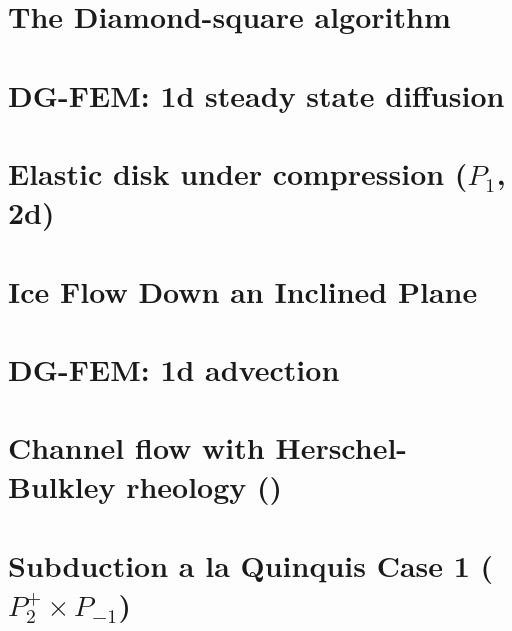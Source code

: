 \documentclass[a4paper,11pt]{report}
\begin{document}
\chapter{The Diamond-square algorithm \label{f56}} %

\chapter{DG-FEM: 1d steady state diffusion \label{f57}} %

\chapter{Elastic disk under compression ($P_1$, 2d) \label{f58}} %

\chapter{Ice Flow Down an Inclined Plane \label{f59}} %

\chapter{DG-FEM: 1d advection \label{f60}} %

\chapter{Channel flow with Herschel-Bulkley rheology (\QtwoQone) \label{f61}} %

\chapter{Subduction a la Quinquis Case 1 ($P_2^+\times P_{-1}$) \label{f62}} %
\end{document}
